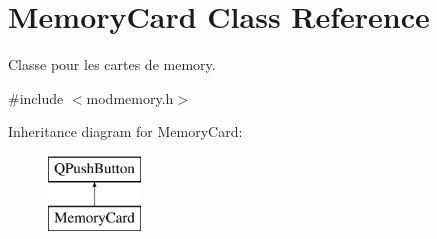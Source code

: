 \hypertarget{class_memory_card}{}\section{Memory\+Card Class Reference}
\label{class_memory_card}


Classe pour les cartes de memory.  




{\ttfamily \#include $<$modmemory.\+h$>$}

Inheritance diagram for Memory\+Card\+:\begin{figure}[H]
\begin{center}
\leavevmode
\includegraphics[height=2.000000cm]{class_memory_card}
\end{center}
\end{figure}
